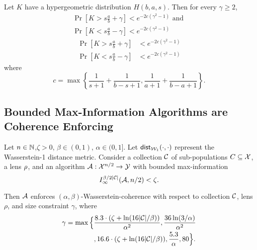 \begin{theorem} \label{thm:hypgeom}
    Let $K$ have a hypergeometric distribution $H(b, a, s)$. Then for every $\gamma \ge 2$,
\ifnum{}
    \begin{multline*}
        \Pr\left[K > s\frac{a}{b} + \gamma \right] < e^{-2 c(\gamma^2 - 1)}  \text{ and }\\
        \Pr \left[K < s\frac{a}{b} - \gamma \right]  < e^{-2 c(\gamma^2 - 1)}
    \end{multline*}
\else
    \begin{align*}
        \Pr[K > s\frac{a}{b} + \gamma] &< e^{-2 c(\gamma^2 - 1)} \\
        \Pr[K < s\frac{a}{b} - \gamma] &< e^{-2 c(\gamma^2 - 1)}
    \end{align*}
\fi
    where
    \[c= \max\left\{\frac{1}{s+1} + \frac{1}{b-s+1}, \frac{1}{a+1} + \frac{1}{b-a+1}\right\}.\]
\end{theorem}



\subsection{Bounded Max-Information Algorithms are Coherence Enforcing}\label{sec:max-info-implies-demographic-coherence}

 
\begin{theorem}\label{thm:max-info-implies-demographic-coherence}
    Let $n\in\mathbb{N}$,$\zeta>0$, $\beta \in (0,1)$, $\alpha \in (0,1]$. Let $\mathsf{dist}_{\mathcal{W}_1}(\cdot,\cdot)$ represent the Wasserstein-1 distance metric. Consider a collection $\mathcal{C}$ of sub-populations $C \subseteq \mathcal{X}$, a lens $\rho$, and an algorithm ${\mathcal{A}:\mathcal{X}^{n/2}\to \mathcal{Y}}$ with bounded max-information 
    $$I^{\beta/2|\mathcal{C}|}_{\infty}(\mathcal{A},n/2) < \zeta.$$ 
    
    Then $\mathcal{A}$ enforces $(\alpha,\beta)$-Wasserstein-coherence with respect to collection $\mathcal{C}$, lens $\rho$, and size constraint $\gamma$, where
     \begin{align}
        \gamma = \max\Big\{ & \frac{8.3 \cdot (\zeta + \ln(16|\mathcal{C}|/\beta))}{\alpha^2}, \frac{36\ln(3/\alpha)}{\alpha^2} \nonumber \\
        &, 16.6 \cdot (\zeta + \ln(16|\mathcal{C}|/\beta)), \frac{5.3}{\alpha}, 80\Big\}.
    \end{align}
    
\end{theorem}

